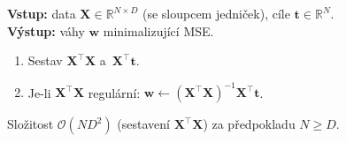 \begin{algo}
\textbf{Vstup:} data $\mathbf{X}\in\mathbb{R}^{N\times D}$ (se sloupcem jedniček), cíle $\mathbf{t}\in\mathbb{R}^N$.\\
\textbf{Výstup:} váhy $\mathbf{w}$ minimalizující MSE.
\begin{enumerate}
  \item Sestav $\mathbf{X}^{\!\top}\mathbf{X}$ a~$\mathbf{X}^{\!\top}\mathbf{t}$. 
  \item Je-li $\mathbf{X}^{\!\top}\mathbf{X}$ regulární: $\mathbf{w}\leftarrow(\mathbf{X}^{\!\top}\mathbf{X})^{-1}\mathbf{X}^{\!\top}\mathbf{t}$. 
\end{enumerate}
Složitost $\mathcal{O}(N D^2)$ (sestavení $\mathbf{X}^{\!\top}\mathbf{X}$) za předpokladu $N\ge D$.
\end{algo}

